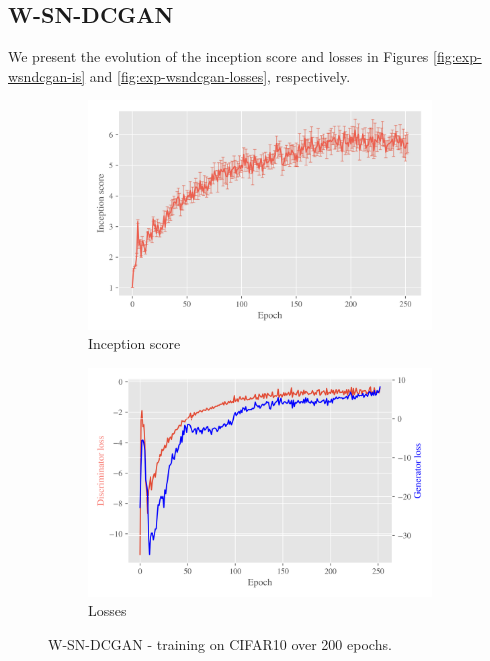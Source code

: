 \subsection{W-SN-DCGAN}
\label{sec:exp-wsndcgan}

We present the evolution of the inception score and losses in Figures \ref{fig:exp-wsndcgan-is} and \ref{fig:exp-wsndcgan-losses}, respectively.
   
\begin{figure}[t!]
    \centering
    \begin{subfigure}[t]{0.49\textwidth}
        \centering
		\includegraphics[width=\textwidth]{../code/results/figures/w-sn-dcgan_cifar10_is.png}
		\caption{Inception score}
		\label{fig:exp-w-sn-dcgan-is}
    \end{subfigure}
    \begin{subfigure}[t]{0.49\textwidth}
        \centering
        \includegraphics[width=\textwidth]{../code/results/figures/w-sn-dcgan_cifar10_losses.png}
		\caption{Losses}
		\label{fig:exp-w-sn-dcgan-losses}
    \end{subfigure}
    \caption{W-SN-DCGAN - training on CIFAR10 over 200 epochs.}
\end{figure}